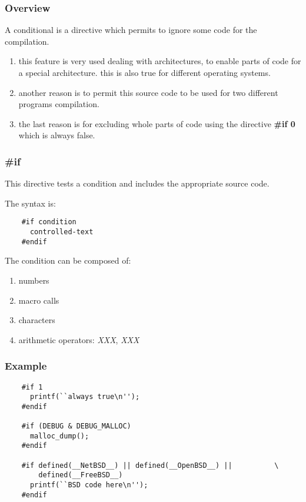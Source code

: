 \documentclass[9pt]{beamer}
\newcommand{\nl}[0]{\vspace{0.4cm}}
\begin{document}

\begin{frame}
  \frametitle{Overview}

  A conditional is a directive which permits to ignore some code for the
  compilation.

  \begin{enumerate}
    \item
      this feature is very used dealing with architectures, to enable
      parts of code for a special architecture. this is also true for
      different operating systems.
    \item
      another reason is to permit this source code to be used for
      two different programs compilation.
    \item
      the last reason is for excluding whole parts of code using the
      directive \textbf{\#if 0} which is always false.
  \end{enumerate}
\end{frame}


\begin{frame}[containsverbatim]
  \frametitle{\textbf{\#if}}

  This directive tests a condition and includes the appropriate source code.

  \nl

  The syntax is:

  \begin{verbatim}
    #if condition
      controlled-text
    #endif
  \end{verbatim}

  The condition can be composed of:

  \begin{enumerate}
    \item
      numbers
    \item
      macro calls
    \item
      characters
    \item
      arithmetic operators: \textit{XXX}, \textit{XXX}
  \end{enumerate}
\end{frame}


\begin{frame}[containsverbatim]
  \frametitle{Example}

  \begin{verbatim}
    #if 1
      printf(``always true\n'');
    #endif

    #if (DEBUG & DEBUG_MALLOC)
      malloc_dump();
    #endif

    #if defined(__NetBSD__) || defined(__OpenBSD__) ||          \
        defined(__FreeBSD__)
      printf(``BSD code here\n'');
    #endif
  \end{verbatim}
\end{frame}
\end{document}
